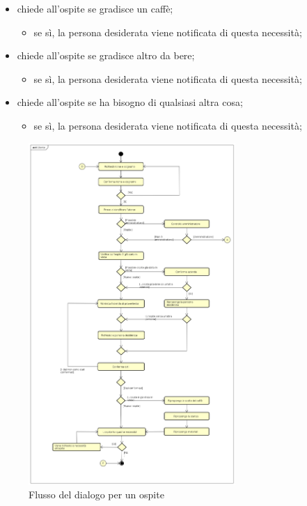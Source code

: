 \begin{itemize}
\begin{itemize}
\begin{itemize}
		\end{itemize}
	\end{itemize}
	\item \PROGETTO{} chiede all'ospite se gradisce un caffè;
	\begin{itemize}
		\item se sì, la persona desiderata viene notificata di questa necessità;
	\end{itemize}
	\item \PROGETTO{} chiede all'ospite se gradisce altro da bere;
	\begin{itemize}
		\item se sì, la persona desiderata viene notificata di questa necessità;
	\end{itemize}
	\item \PROGETTO{} chiede all'ospite se ha bisogno di qualsiasi altra cosa;
	\begin{itemize}
		\item se sì, la persona desiderata viene notificata di questa necessità;
	\end{itemize}
\end{itemize}
\begin{figure}[h]\label{flussoOspite}
	\centerline{\includegraphics[width=0.7\textwidth,height=\textheight,keepaspectratio]{sezioni/images/Utente.png}}
	\caption{Flusso del dialogo per un ospite}
\end{figure}
\newpage
